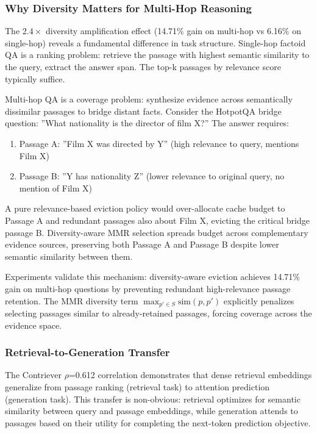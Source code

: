 
\subsubsection{Why Diversity Matters for Multi-Hop Reasoning}

The 2.$4\times$ diversity amplification effect (14.71\% gain on multi-hop vs 6.16\% on single-hop) reveals a fundamental difference in task structure. Single-hop factoid QA is a ranking problem: retrieve the passage with highest semantic similarity to the query, extract the answer span. The top-k passages by relevance score typically suffice.

Multi-hop QA is a coverage problem: synthesize evidence across semantically dissimilar passages to bridge distant facts. Consider the HotpotQA bridge question: ''What nationality is the director of film X?'' The answer requires:

\begin{enumerate}
\item Passage A: ''Film X was directed by Y'' (high relevance to query, mentions Film X)
\item Passage B: ''Y has nationality Z'' (lower relevance to original query, no mention of Film X)
\end{enumerate}

A pure relevance-based eviction policy would over-allocate cache budget to Passage A and redundant passages also about Film X, evicting the critical bridge passage B. Diversity-aware MMR selection spreads budget across complementary evidence sources, preserving both Passage A and Passage B despite lower semantic similarity between them.

Experiments validate this mechanism: diversity-aware eviction achieves 14.71\% gain on multi-hop questions by preventing redundant high-relevance passage retention. The MMR diversity term $\max_{p' \in S} \text{sim}(p, p')$ explicitly penalizes selecting passages similar to already-retained passages, forcing coverage across the evidence space.

\subsubsection{Retrieval-to-Generation Transfer}

The Contriever $\rho$=0.612 correlation demonstrates that dense retrieval embeddings generalize from passage ranking (retrieval task) to attention prediction (generation task). This transfer is non-obvious: retrieval optimizes for semantic similarity between query and passage embeddings, while generation attends to passages based on their utility for completing the next-token prediction objective.

